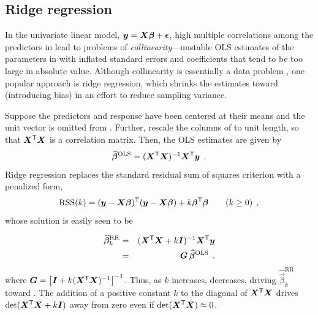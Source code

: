 \subsection{Ridge regression}

In the univariate linear model, $\bm{y} = \bm{X} \bm{\beta} + \bm{\epsilon}$,
high multiple correlations among the predictors in  lead to problems
of \emph{collinearity}---unstable OLS
estimates of the parameters in \vec{\beta} with inflated standard errors
and coefficients that tend to be too large in absolute value.
Although collinearity is essentially a data problem
\citep{Fox:2008},
one popular approach is ridge regression, which shrinks the estimates toward
 (introducing bias) in an effort to reduce sampling variance.


Suppose the predictors and response have been centered at their means and the unit vector is
omitted from . Further, rescale the columns of  to unit length, so that $\bm{X}^\mathsf{T} \bm{X}$ is a correlation matrix.
Then, the OLS estimates are given by
\begin{equation}
\widehat{\bm{\beta}}^{\mathrm{OLS}} = (\bm{X}^\mathsf{T} \bm{X})^{-1} \bm{X}^\mathsf{T} \bm{y} \:\: .
\end{equation}
Ridge regression replaces the standard residual sum of squares criterion with a penalized
form,
\begin{equation}
\mathrm{RSS}(k) = (\bm{y}-\bm{X} \bm{\beta}) ^\mathsf{T}  (\bm{y}-\bm{X} \bm{\beta}) + k \bm{\beta}^\mathsf{T}\bm{\beta} \quad\quad (k \ge 0)
 \:\: , \label{eq:ridgeRSS}
\end{equation}
whose solution is easily seen to be

\begin{eqnarray}
\widehat{\bm{\beta}}^{\mathrm{RR}}_k  & = &(\bm{X}^\mathsf{T} \bm{X} + k \bm{I})^{-1} \bm{X}^\mathsf{T} \bm{y}  \label{eq:ridge-beta} \\
                                    & = & \bm{G} \, \widehat{\bm{\beta}}^{\mathrm{OLS}}  \nonumber \:\: .
\end{eqnarray}
where $\bm{G} = \left[\bm{I} + k (\bm{X}^\mathsf{T} \bm{X})^{-1} \right] ^{-1}$.
Thus, as $k$ increases,  decreases, driving $\widehat{\vec{\beta}}^{\mathrm{RR}}_k$ toward 
\citep{HoerlKennard:1970a,HoerlKennard:1970b}.  The addition of a positive constant $k$ to the diagonal of $\bm{X}^\mathsf{T}\bm{X}$
drives $\mathrm{det} (\bm{X}^\mathsf{T}\bm{X}+ k \bm{I})$ away from zero even if $\mathrm{det} (\bm{X}^\mathsf{T}\bm{X})\approx 0$.

